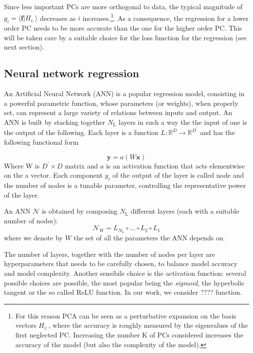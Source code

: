 \documentclass[twocolumn,showpacs,preprintnumbers,nofootinbib,prd,
superscriptaddress,10pt]{revtex4-1}
\newcommand{\R}{\mathbb{R}}
\begin{document}
Since less important PCs are more orthogonal to data, the typical magnitude of $g_i = \langle \mathbf{f} | H_{i:} \rangle$ decreases as $i$ increases.\footnote{For this reason PCA can be seen as a perturbative expansion on the basis vectors $H_{i:}$, where the accuracy is roughly measured by the eigenvalues of the first neglected PC. Increasing the number K of PCs considered increases the accuracy of the model (but also the complexity of the model).}.
As a consequence, the regression for a lower order PC needs to be more accurate than the one for the higher order PC. This will be taken care by a suitable choice for the loss function for the regression (see next section).


\subsection{Neural network regression}
\label{sec:NN}

An Artificial Neural Network (ANN) is a popular regression model, consisting in a powerful parametric function, whose parameters (or weights), when properly set, can represent a large variety of relations between inputs and output.
An ANN is built by stacking together $N_\text{L}$ layers in such a way the the input of one is the output of the following. Each layer is a function $L: \R^D \rightarrow \R^{D^\prime} $ and has the following functional form

\begin{equation}
	\boldsymbol{y} = a(W\boldsymbol{x})
\end{equation}
%
Where W is $D^\prime \times D$ matrix and $a$ is an activation function that acts elementwise on the a vector.
Each component $y_i$ of the output of the layer is called node and the number of nodes is a tunable parameter, controlling the representative power of the layer.

An ANN $\mathcal{N}$ is obtained by composing $N_\text{L}$ different layers (each with a suitable number of nodes):
%
\begin{equation}
	\mathcal{N}_W = L_{N_\text{L}} \circ \hdots \circ L_2 \circ L_1
\end{equation}
%
where we denote by $W$ the set of all the parameters the ANN depends on.

The number of layers, together with the number of nodes per layer are hyperparameters that needs to be carefully chosen, to balance model accuracy and model complexity.
Another sensibile choice is the activation function: several possible choices are possible, the most popular being the {\it sigmoid}, the hyperbolic tangent or the so called ReLU function. In our work, we consider ???? function.
\end{document}
